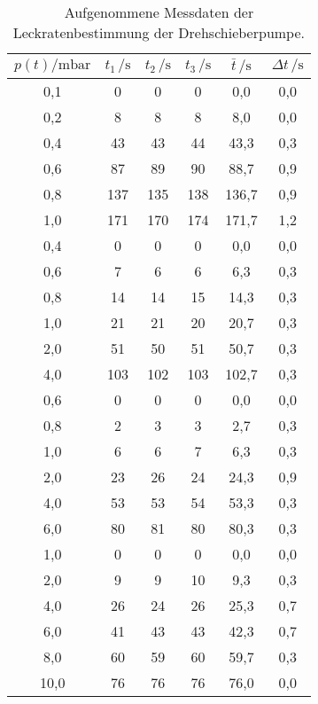 \begin{table}
	\begin{center}
		\begin{tabular}{c|ccc|cc}
			\toprule
			{$p(t) /\mathrm{mbar}$} & {$t_1\, /\mathrm{s}$} & {$t_2\, /\mathrm{s}$} & {$t_3\, /\mathrm{s}$} & {$\bar{t}\, /\mathrm{s}$} & {$\Delta t\, /\mathrm{s}$}\\
			\midrule
			0,1 & 0 & 0 & 0 & 0,0 & 0,0\\
			0,2 & 8 & 8 & 8 & 8,0 & 0,0\\
			0,4 & 43 & 43 & 44 & 43,3 & 0,3\\
			0,6 & 87 & 89 & 90 & 88,7 & 0,9\\
			0,8 & 137 & 135 & 138 & 136,7 & 0,9\\
			1,0 & 171 & 170 & 174 & 171,7 & 1,2\\
			\hline
			0,4 & 0 & 0 & 0 & 0,0 & 0,0\\
			0,6 & 7 & 6 & 6 & 6,3 & 0,3\\
			0,8 & 14 & 14 & 15 & 14,3 & 0,3\\
			1,0 & 21 & 21 & 20 & 20,7 & 0,3\\
			2,0 & 51 & 50 & 51 & 50,7 & 0,3\\
			4,0 & 103 & 102 & 103 & 102,7 & 0,3\\
			\hline
			0,6 & 0 & 0 & 0 & 0,0 & 0,0\\
			0,8 & 2 & 3 & 3 & 2,7 & 0,3\\
			1,0 & 6 & 6 & 7 & 6,3 & 0,3\\
			2,0 & 23 & 26 & 24 & 24,3 & 0,9\\
			4,0 & 53 & 53 & 54 & 53,3 & 0,3\\
			6,0 & 80 & 81 & 80 & 80,3 & 0,3\\
			\hline
			1,0 & 0 & 0 & 0 & 0,0 & 0,0\\
			2,0 & 9 & 9 & 10 & 9,3 & 0,3\\
			4,0 & 26 & 24 & 26 & 25,3 & 0,7\\
			6,0 & 41 & 43 & 43 & 42,3 & 0,7\\
			8,0 & 60 & 59 & 60 & 59,7 & 0,3\\
			10,0 & 76 & 76 & 76 & 76,0 & 0,0\\
			\bottomrule
		\end{tabular}
		\caption{Aufgenommene Messdaten der Leckratenbestimmung der Drehschieberpumpe.}
		\label{tab5}
	\end{center}
\end{table}


